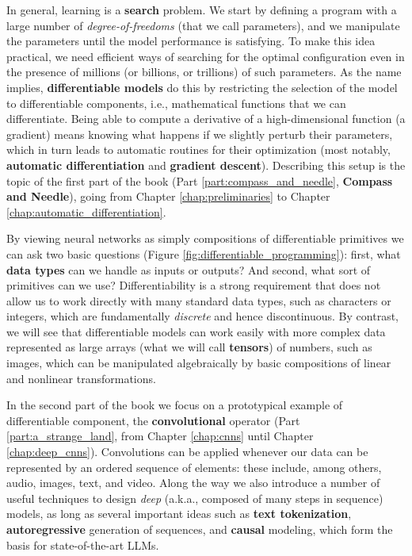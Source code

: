 In general, learning is a \textbf{search} problem. We start by defining a program with a large number of \textit{degree-of-freedoms} (that we call parameters), and we manipulate the parameters until the model performance is satisfying. To make this idea practical, we need efficient ways of searching for the optimal configuration even in the presence of millions (or billions, or trillions) of such parameters. As the name implies, \textbf{differentiable models} do this by restricting the selection of the model to differentiable components, i.e., mathematical functions that we can differentiate. Being able to compute a derivative of a high-dimensional function (a gradient) means knowing what happens if we slightly perturb their parameters, which in turn leads to automatic routines for their optimization (most notably, \textbf{automatic differentiation} and \textbf{gradient descent}). Describing this setup is the topic of the first part of the book (Part \ref{part:compass_and_needle}, \textbf{Compass and Needle}), going from Chapter \ref{chap:preliminaries} to Chapter \ref{chap:automatic_differentiation}.

By viewing neural networks as simply compositions of differentiable primitives we can ask two basic questions (Figure \ref{fig:differentiable_programming}): first, what \textbf{data types} can we handle as inputs or outputs? And second, what sort of primitives can we use? Differentiability is a strong requirement that does not allow us to work directly with many standard data types, such as characters or integers, which are fundamentally \textit{discrete} and hence discontinuous. By contrast, we will see that differentiable models can work easily with more complex data represented as large arrays (what we will call \textbf{tensors}) of numbers, such as images, which can be manipulated algebraically by basic compositions of linear and nonlinear transformations. 

In the second part of the book we focus on a prototypical example of differentiable component, the \textbf{convolutional} operator (Part \ref{part:a_strange_land}, from Chapter \ref{chap:cnns} until Chapter \ref{chap:deep_cnns}). Convolutions can be applied whenever our data can be represented by an ordered sequence of elements: these include, among others, audio, images, text, and video. Along the way we also introduce a number of useful techniques to design \textit{deep} (a.k.a., composed of many steps in sequence) models, as long as several important ideas such as \textbf{text tokenization}, \textbf{autoregressive} generation of sequences, and \textbf{causal} modeling, which form the basis for state-of-the-art LLMs. 

